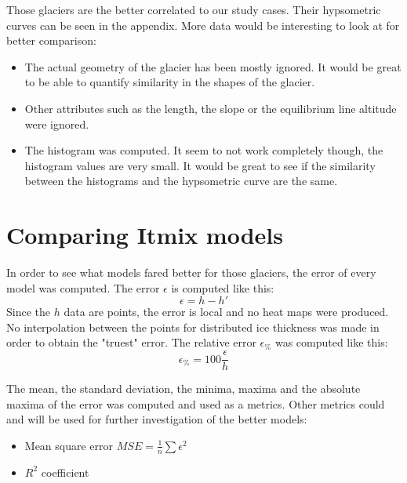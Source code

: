 \documentclass[a4, 12pt]{article}
\begin{document}
Those glaciers are the better correlated to our study cases. Their hypsometric curves can be seen in the appendix. More data would be interesting to look at for better comparison:
\begin{itemize}
	\item The actual geometry of the glacier has been mostly ignored. It would be great to be able to quantify similarity in the shapes of the glacier.
	\item Other attributes such as the length, the slope or the equilibrium line altitude were ignored. 
	\item The histogram was computed. It seem to not work completely though, the histogram values are very small. It would be great to see if the similarity between the histograms and the hypsometric curve are the same.
\end{itemize}


\section{Comparing Itmix models}
In order to see what models fared better for those glaciers, the error of every model was computed. The error $\epsilon$ is computed like this:
\[\epsilon = h - h'\]
Since the $h$ data are points, the error is local and no heat maps were produced. No interpolation between the points for distributed ice thickness was made in order to obtain the "truest" error.
The relative error $\epsilon_\%$ was computed like this:\\
\[\epsilon_\% = 100\frac{\epsilon}{h}\]

The mean, the standard deviation, the minima, maxima and the absolute maxima of the error was computed and used as a metrics. Other metrics could and will be used for further investigation of the better models:
\begin{itemize}
\item Mean square error $MSE = \frac{1}{n}\sum{\epsilon^2}$
\item $R^2$ coefficient
\end{itemize}
\end{document}
